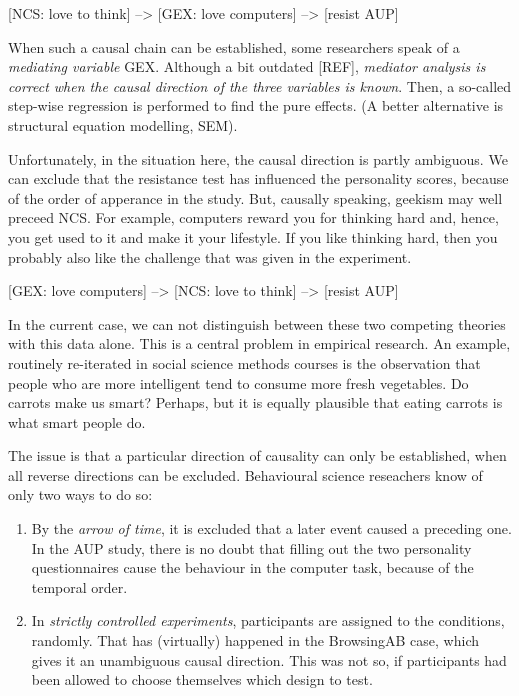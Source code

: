 \documentclass[]{svmono}
\providecommand{\tightlist}{%
  \setlength{\itemsep}{0pt}\setlength{\parskip}{0pt}}
\begin{document}
{[}NCS: love to think{]} --\textgreater{} {[}GEX: love computers{]}
--\textgreater{} {[}resist AUP{]}

When such a causal chain can be established, some researchers speak of a
\emph{mediating variable} GEX. Although a bit outdated {[}REF{]},
\emph{mediator analysis is correct when the causal direction of the
three variables is known}. Then, a so-called step-wise regression is
performed to find the pure effects. (A better alternative is structural
equation modelling, SEM).

Unfortunately, in the situation here, the causal direction is partly
ambiguous. We can exclude that the resistance test has influenced the
personality scores, because of the order of apperance in the study. But,
causally speaking, geekism may well preceed NCS. For example, computers
reward you for thinking hard and, hence, you get used to it and make it
your lifestyle. If you like thinking hard, then you probably also like
the challenge that was given in the experiment.

{[}GEX: love computers{]} --\textgreater{} {[}NCS: love to think{]}
--\textgreater{} {[}resist AUP{]}

In the current case, we can not distinguish between these two competing
theories with this data alone. This is a central problem in empirical
research. An example, routinely re-iterated in social science methods
courses is the observation that people who are more intelligent tend to
consume more fresh vegetables. Do carrots make us smart? Perhaps, but it
is equally plausible that eating carrots is what smart people do.

The issue is that a particular direction of causality can only be
established, when all reverse directions can be excluded. Behavioural
science reseachers know of only two ways to do so:

\begin{enumerate}
\def\labelenumi{\arabic{enumi}.}
\tightlist
\item
  By the \emph{arrow of time}, it is excluded that a later event caused
  a preceding one. In the AUP study, there is no doubt that filling out
  the two personality questionnaires cause the behaviour in the computer
  task, because of the temporal order.
\item
  In \emph{strictly controlled experiments}, participants are assigned
  to the conditions, randomly. That has (virtually) happened in the
  BrowsingAB case, which gives it an unambiguous causal direction. This
  was not so, if participants had been allowed to choose themselves
  which design to test.
\end{enumerate}
\end{document}
